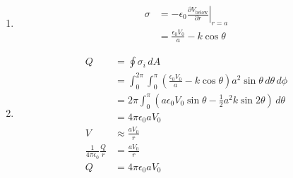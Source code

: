 \documentclass{article}
\newcommand{\ke}{\frac{1}{4 \pi \epsilon_0}}
\begin{document}
\begin{enumerate}
  \item

        \begin{align*}
          \sigma & = -\epsilon_0 \left. \frac{\partial V_\text{below}}{\partial r} \right|_{r = a} \\
                 & = \frac{\epsilon_0 V_0}{a} - k \cos \theta
        \end{align*}

  \item

        \begin{align*}
          Q               & = \oint \sigma_i \,d A                                                                                                  \\
                          & = \int_0^{2 \pi} \int_0^\pi \left( \frac{\epsilon_0 V_0}{a} - k \cos \theta \right) a^2 \sin \theta \,d \theta \,d \phi \\
                          & = 2 \pi \int_0^\pi \left( a \epsilon_0 V_0 \sin \theta - \frac{1}{2} a^2 k \sin 2 \theta \right) \,d \theta             \\
                          & = 4 \pi \epsilon_0 a V_0                                                                                                \\
          V               & \approx \frac{a V_0}{r}                                                                                                 \\
          \ke \frac{Q}{r} & = \frac{a V_0}{r}                                                                                                       \\
          Q               & = 4 \pi \epsilon_0 a V_0
        \end{align*}
\end{enumerate}

\subsection{}
\end{document}
